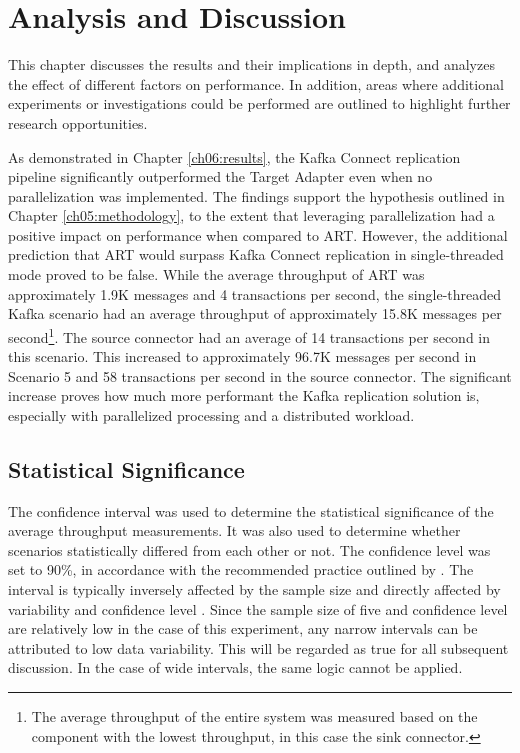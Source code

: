 \chapter{Analysis and Discussion}
\label{ch07:discussion}
This chapter discusses the results and their implications in depth, and analyzes the effect of different factors on performance. In addition, areas where additional experiments or investigations could be performed are outlined to highlight further research opportunities.

As demonstrated in Chapter \ref{ch06:results}, the Kafka Connect replication pipeline significantly outperformed the Target Adapter even when no parallelization was implemented. The findings support the hypothesis outlined in Chapter \ref{ch05:methodology}, to the extent that leveraging parallelization had a positive impact on performance when compared to \ac{ART}. However, the additional prediction that \ac{ART} would surpass Kafka Connect replication in single-threaded mode proved to be false. While the average throughput of \ac{ART} was approximately 1.9K messages and 4 transactions per second, the single-threaded Kafka scenario had an average throughput of approximately 15.8K messages per second\footnote{The average throughput of the entire system was measured based on the component with the lowest throughput, in this case the sink connector.}. The source connector had an average of 14 transactions per second in this scenario. This increased to approximately 96.7K messages per second in Scenario 5 and 58 transactions per second in the source connector. The significant increase proves how much more performant the Kafka replication solution is, especially with parallelized processing and a distributed workload.

\section{Statistical Significance}
\label{ch07:discussion:statsig}
The confidence interval was used to determine the statistical significance of the average throughput measurements. It was also used to determine whether scenarios statistically differed from each other or not. The confidence level was set to 90\%, in accordance with the recommended practice outlined by \citeauthor{jain1991computer} \cite{jain1991computer}. The interval is typically inversely affected by the sample size and directly affected by variability and confidence level \cite{hazrausingci}. Since the sample size of five and confidence level are relatively low in the case of this experiment, any narrow intervals can be attributed to low data variability. This will be regarded as true for all subsequent discussion. In the case of wide intervals, the same logic cannot be applied.

